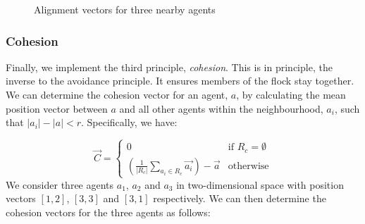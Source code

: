 \documentclass[12pt]{article}
\begin{document}
\begin{figure}[ht]
    \centering
    \caption{Alignment vectors for three nearby agents}
    \label{fig:alignment-2d}
\end{figure}

\subsubsection{Cohesion}

Finally, we implement the third principle, \emph{cohesion}. This is in principle, the inverse to the avoidance principle. It ensures members of the flock stay together. We can determine the cohesion vector for an agent, $a$, by calculating the mean position vector between $a$ and all other agents within the neighbourhood, $a_i$, such that $|a_i| - |a| < r$. Specifically, we have:

\begin{equation}
\vec{C} =
\begin{cases}
    0 & \text{if } R_c = \emptyset \\
    \left(
    \frac{1}{|R_c|} \sum_{a_i \in R_c} \vec{a_i} \right) - \vec{a} & \text{otherwise}
\end{cases}
\end{equation}
We consider three agents $a_1$, $a_2$ and $a_3$ in two-dimensional space with position vectors $[1,2]$, $[3,3]$ and $[3,1]$ respectively. We can then determine the cohesion vectors for the three agents as follows:
\end{document}
